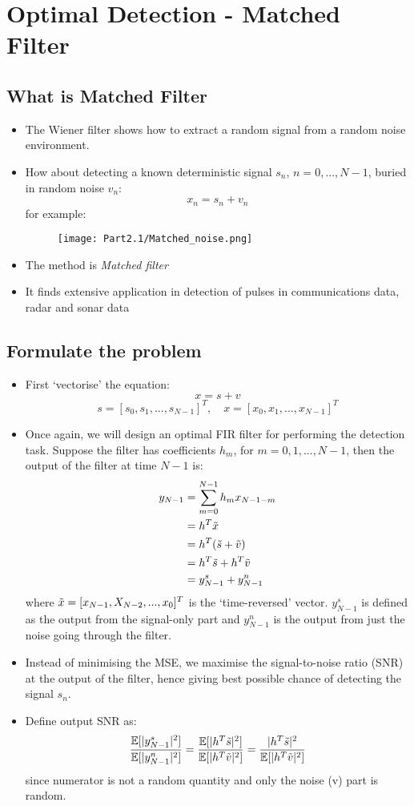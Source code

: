 \documentclass[12pt]{article}
\newcommand{\titc}[1]{\textit{\textcolor{blue1}{#1}}}
\newcommand{\mexp}{\mathbb{E}}
\begin{document}
\section{Optimal Detection - Matched Filter}
\subsection{What is Matched Filter}
\begin{itemize}
    \item The Wiener filter shows how to extract a random signal from a random noise environment.
    \item How about detecting a known deterministic signal $s_n$, $n=0,...,N-1$, buried in random noise $v_n$:
    \[
    x_n = s_n +v_n
    \]
    for example:
    \begin{figure}[H]
        \centering
        \texttt{[image: Part2.1/Matched\_noise.png]}
    \end{figure}
    \item The method is \titc{Matched filter}
    \item It finds extensive application in detection of pulses in communications data, radar and sonar data
\end{itemize}

\subsection{Formulate the problem}
\begin{itemize}
    \item First `vectorise' the equation:
    \[
    x = s + v
    \]
    \[
    s= [s_0,s_1,...,s_{N-1}]^T, \quad x = [x_0,x_1,...,x_{N-1}]^T
    \]
    \item Once again, we will design an optimal FIR filter for performing the detection task. Suppose the filter has coefficients $h_m$, for $m= 0,1,...,N-1$, then the output of the filter at time $N-1$ is:
    \begin{align*}
        y_{N-1} &= \sum_{m=0}^{N-1}h_m x_{N-1-m} \\
        & = h^T \Tilde{x} \\
        & = h^T (\Tilde{s} + \Tilde{v}) \\
        & = h^T\Tilde{s} + h^T\Tilde{v} \\
        & = y^s_{N-1} + y^n_{N-1} 
    \end{align*}
    where $\Tilde{x} = [x_{N-1},X_{N-2},...,x_0]^T$ is the `time-reversed' vector. $y^s_{N-1}$ is defined as the output from the signal-only part and $ y^n_{N-1}$ is the output from just the noise going through the filter.
    
    \item Instead of minimising the MSE, we maximise the signal-to-noise ratio (SNR) at the output of the filter, hence giving best possible chance of detecting the signal $s_n$.
    \item Define output SNR as:
    \[
    \frac{\mexp[|y^s_{N-1}|^2]}{\mexp[|y^n_{N-1}|^2]} = \frac{\mexp[|h^T\Tilde{s}|^2]}{\mexp[|h^T\Tilde{v}|^2]} = \frac{|h^T\Tilde{s}|^2}{\mexp[|h^T\Tilde{v}|^2]}
    \]
    since numerator is not a random quantity and only the noise (v) part is random.
    \end{itemize}
\end{document}
